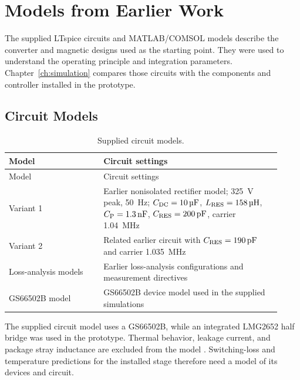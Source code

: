 \chapter{Models from Earlier Work}
\label{app:modeling}

The supplied LTspice circuits and MATLAB/COMSOL models describe the converter and magnetic designs used as the starting point. They were used to understand the operating principle and integration parameters. Chapter~\ref{ch:simulation} compares those circuits with the components and controller installed in the prototype.

\section{Circuit Models}
\begin{longtable}{@{}L{0.32\linewidth}L{0.60\linewidth}@{}}
\caption{Supplied circuit models.}\label{tab:app-ltspice-files}\\
\toprule Model & Circuit settings\\\midrule
\endfirsthead
\toprule Model & Circuit settings\\\midrule
\endhead
Variant 1 & Earlier nonisolated rectifier model; \SI{325}{\volt} peak, \SI{50}{\hertz}; \(C_{\mathrm{DC}}=\SI{10}{\micro\farad}\), \(\LRES=\SI{158}{\micro\henry}\), \(C_{\mathrm{P}}=\SI{1.3}{\nano\farad}\), \(\CRES=\SI{200}{\pico\farad}\), carrier \SI{1.04}{\mega\hertz}\\
Variant 2 & Related earlier circuit with \(\CRES=\SI{190}{\pico\farad}\) and carrier \SI{1.035}{\mega\hertz}\\
Loss-analysis models & Earlier loss-analysis configurations and measurement directives\\
GS66502B model & GS66502B device model used in the supplied simulations\\
\bottomrule
\end{longtable}
The supplied circuit model uses a GS66502B, while an integrated LMG2652 half bridge was used in the prototype. Thermal behavior, leakage current, and package stray inductance are excluded from the model \cite{gansystemsGS66502Bmodel}. Switching-loss and temperature predictions for the installed stage therefore need a model of its devices and circuit.

